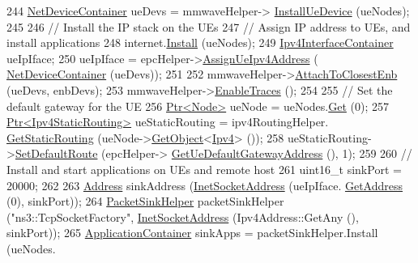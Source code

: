 \begin{DoxyCode}
244         \hyperlink{classns3_1_1NetDeviceContainer}{NetDeviceContainer} ueDevs = mmwaveHelper->
      \hyperlink{classns3_1_1MmWaveHelper_a9311c819d7ee539c8710c5b7e98df37a}{InstallUeDevice} (ueNodes);
245 
246         \textcolor{comment}{// Install the IP stack on the UEs}
247         \textcolor{comment}{// Assign IP address to UEs, and install applications}
248         internet.\hyperlink{classns3_1_1InternetStackHelper_a6645b412f31283d2d9bc3d8a95cebbc0}{Install} (ueNodes);
249         \hyperlink{classns3_1_1Ipv4InterfaceContainer}{Ipv4InterfaceContainer} ueIpIface;
250         ueIpIface = epcHelper->\hyperlink{classns3_1_1MmWavePointToPointEpcHelper_ad96757d4c63d33f683dce1b5d6bca3b9}{AssignUeIpv4Address} (
      \hyperlink{classns3_1_1NetDeviceContainer}{NetDeviceContainer} (ueDevs));
251 
252         mmwaveHelper->\hyperlink{classns3_1_1MmWaveHelper_a202baea67b0af0d4fb6069de73766dc6}{AttachToClosestEnb} (ueDevs, enbDevs);
253         mmwaveHelper->\hyperlink{classns3_1_1MmWaveHelper_a4eae3871876b62965d612d9a56ed21bc}{EnableTraces} ();
254 
255         \textcolor{comment}{// Set the default gateway for the UE}
256         \hyperlink{classns3_1_1Ptr}{Ptr<Node>} ueNode = ueNodes.\hyperlink{classns3_1_1NodeContainer_a9ed96e2ecc22e0f5a3d4842eb9bf90bf}{Get} (0);
257         \hyperlink{classns3_1_1Ptr}{Ptr<Ipv4StaticRouting>} ueStaticRouting = ipv4RoutingHelper.
      \hyperlink{classns3_1_1Ipv4StaticRoutingHelper_a731206e50d305695dac7fb2ef963a4bb}{GetStaticRouting} (ueNode->\hyperlink{classns3_1_1Object_a13e18c00017096c8381eb651d5bd0783}{GetObject}<\hyperlink{classns3_1_1Ipv4}{Ipv4}> ());
258         ueStaticRouting->\hyperlink{classns3_1_1Ipv4StaticRouting_aee30fa3246c2b42f122dabdff2725331}{SetDefaultRoute} (epcHelper->
      \hyperlink{classns3_1_1MmWavePointToPointEpcHelper_afefac14ad79ff059b052305013d2beb3}{GetUeDefaultGatewayAddress} (), 1);
259 
260         \textcolor{comment}{// Install and start applications on UEs and remote host}
261         uint16\_t sinkPort = 20000;
262 
263         \hyperlink{classns3_1_1Address}{Address} sinkAddress (\hyperlink{classns3_1_1InetSocketAddress}{InetSocketAddress} (ueIpIface.
      \hyperlink{classns3_1_1Ipv4InterfaceContainer_ae63208dcd222be986822937ee4aa828c}{GetAddress} (0), sinkPort));
264         \hyperlink{classns3_1_1PacketSinkHelper}{PacketSinkHelper} packetSinkHelper (\textcolor{stringliteral}{"ns3::TcpSocketFactory"}, 
      \hyperlink{classns3_1_1InetSocketAddress}{InetSocketAddress} (Ipv4Address::GetAny (), sinkPort));
265         \hyperlink{classns3_1_1ApplicationContainer}{ApplicationContainer} sinkApps = packetSinkHelper.Install (ueNodes.

\end{DoxyCode}
